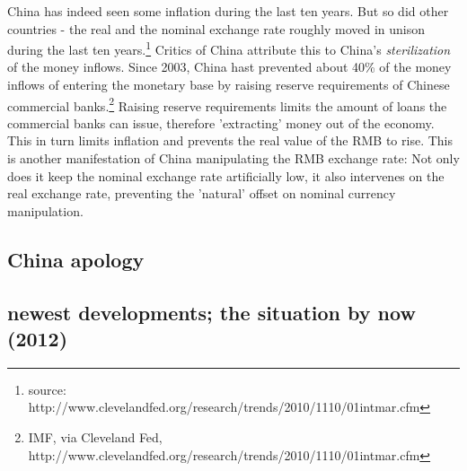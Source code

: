 \documentclass[11pt]{article}
\begin{document}
China has indeed seen some inflation during the last ten years. But so did other countries - the real and the nominal exchange rate roughly moved in unison during the last ten years.\footnote{source: http://www.clevelandfed.org/research/trends/2010/1110/01intmar.cfm}%
Critics of China attribute this to China's \emph{sterilization} of the money inflows. Since 2003, China hast prevented about 40\% of the money inflows of entering the monetary base by raising reserve requirements of Chinese commercial banks.\footnote{IMF, via Cleveland Fed, http://www.clevelandfed.org/research/trends/2010/1110/01intmar.cfm}%
Raising reserve requirements limits the amount of loans the commercial banks can issue, therefore 'extracting' money out of the economy. This in turn limits inflation and prevents the real value of the RMB to rise. This is another manifestation of China manipulating the RMB exchange rate: Not only does it keep the nominal exchange rate artificially low, it also intervenes on the real exchange rate, preventing the 'natural' offset on nominal currency manipulation.



\subsection{China apology}


\subsection{newest developments; the situation by now (2012)}
\end{document}
